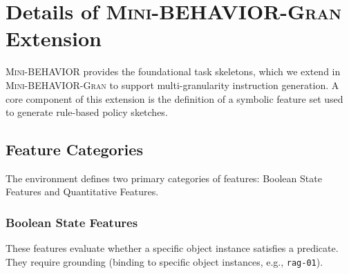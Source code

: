 \section{Details of \textsc{Mini-BEHAVIOR-Gran} Extension}
\label{app_sec:minibehavior_gran_details}

\textsc{Mini-BEHAVIOR} provides the foundational task skeletons, which we extend in \textsc{Mini-BEHAVIOR-Gran} to support multi-granularity instruction generation. A core component of this extension is the definition of a symbolic feature set used to generate rule-based policy sketches.


\subsection{Feature Categories}

The environment defines two primary categories of features: Boolean State Features and Quantitative Features.

\subsubsection{Boolean State Features}
These features evaluate whether a specific object instance satisfies a predicate. They require grounding (binding to specific object instances, e.g., \texttt{rag-01}).

\begin{table}[t]
\centering
\caption{Boolean State Features}
\label{tab:bool_features}
\end{table}

